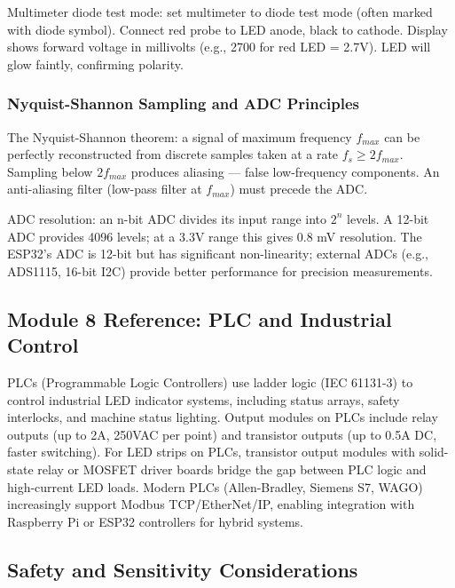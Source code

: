 \documentclass[11pt,letterpaper]{article}
\begin{document}
Multimeter diode test mode: set multimeter to diode test mode (often marked with diode symbol). Connect red probe to LED anode, black to cathode. Display shows forward voltage in millivolts (e.g., 2700 for red LED = 2.7V). LED will glow faintly, confirming polarity.

\subsubsection{Nyquist-Shannon Sampling and ADC Principles}

The Nyquist-Shannon theorem: a signal of maximum frequency $f_{max}$ can be perfectly reconstructed from discrete samples taken at a rate $f_s \geq 2 f_{max}$. Sampling below $2 f_{max}$ produces aliasing --- false low-frequency components. An anti-aliasing filter (low-pass filter at $f_{max}$) must precede the ADC.

ADC resolution: an n-bit ADC divides its input range into $2^n$ levels. A 12-bit ADC provides 4096 levels; at a 3.3V range this gives 0.8 mV resolution. The ESP32's ADC is 12-bit but has significant non-linearity; external ADCs (e.g., ADS1115, 16-bit I2C) provide better performance for precision measurements.

\subsection{Module 8 Reference: PLC and Industrial Control}

PLCs (Programmable Logic Controllers) use ladder logic (IEC 61131-3) to control industrial LED indicator systems, including status arrays, safety interlocks, and machine status lighting. Output modules on PLCs include relay outputs (up to 2A, 250VAC per point) and transistor outputs (up to 0.5A DC, faster switching). For LED strips on PLCs, transistor output modules with solid-state relay or MOSFET driver boards bridge the gap between PLC logic and high-current LED loads. Modern PLCs (Allen-Bradley, Siemens S7, WAGO) increasingly support Modbus TCP/EtherNet/IP, enabling integration with Raspberry Pi or ESP32 controllers for hybrid systems.

\subsection{Safety and Sensitivity Considerations}
\end{document}
